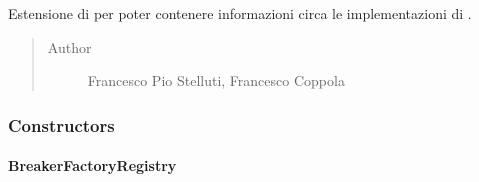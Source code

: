 \documentclass[letterpaper,10pt,italian,openany,oneside]{sphinxmanual}
\begin{document}
\begin{fulllineitems}
\label{\detokenize{source/it/unicam/cs/pa/mastermind/factories/BreakerFactoryRegistry:it.unicam.cs.pa.mastermind.factories.BreakerFactoryRegistry}}
Estensione di  per poter contenere informazioni circa le implementazioni di .
\begin{quote}\begin{description}
\item[{Author}] \leavevmode
Francesco Pio Stelluti, Francesco Coppola

\end{description}\end{quote}

\end{fulllineitems}



\subsubsection{Constructors}
\label{\detokenize{source/it/unicam/cs/pa/mastermind/factories/BreakerFactoryRegistry:constructors}}

\paragraph{BreakerFactoryRegistry}
\label{\detokenize{source/it/unicam/cs/pa/mastermind/factories/BreakerFactoryRegistry:id1}}
\end{document}
